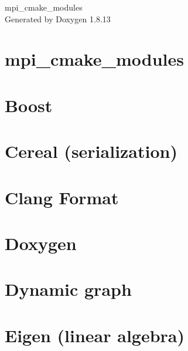 \documentclass[twoside]{book}
\newcommand{\+}{\discretionary{\mbox{\scriptsize$\hookleftarrow$}}{}{}}
\newcommand{\clearemptydoublepage}{%
  \newpage{\pagestyle{empty}\cleardoublepage}%
}
\begin{document}
\hypersetup{pageanchor=false,
             bookmarksnumbered=true,
             pdfencoding=unicode
            }
\begin{titlepage}
\vspace*{7cm}
\begin{center}%
{\Large mpi\+\_\+cmake\+\_\+modules }\\
\vspace*{1cm}
{\large Generated by Doxygen 1.8.13}\\
\end{center}
\end{titlepage}
\clearemptydoublepage
{}
\tableofcontents
\clearemptydoublepage
{}
\hypersetup{pageanchor=true}

\chapter{mpi\+\_\+cmake\+\_\+modules}
\label{index}\hypertarget{index}{}
\chapter{Boost}
\label{md_doc_boost}

\chapter{Cereal (serialization)}
\label{md_doc_cereal}

\chapter{Clang Format}
\label{md_doc_clang_format}

\chapter{Doxygen}
\label{md_doc_doxygen}

\chapter{Dynamic graph}
\label{md_doc_dynamic_graph}

\chapter{Eigen (linear algebra)}
\label{md_doc_eigen}

\end{document}
